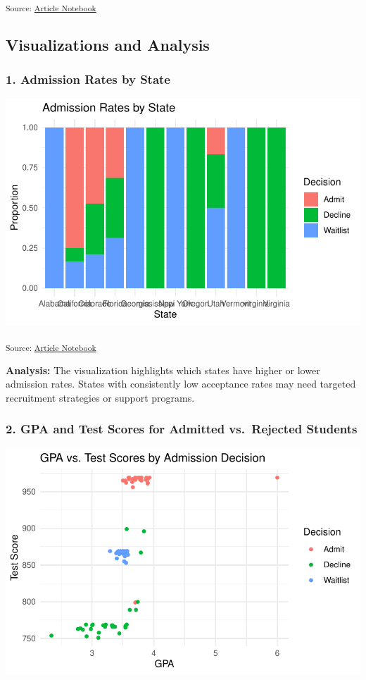 \documentclass[
  letterpaper,
  DIV=11,
  numbers=noendperiod]{scrartcl}
\begin{document}
\textsubscript{Source:
\href{https://verkyyi.github.io/5900-hw1/index.qmd.html}{Article
Notebook}}

\subsection{Visualizations and
Analysis}\label{visualizations-and-analysis}

\subsubsection{1. Admission Rates by
State}\label{admission-rates-by-state}

\includegraphics{index_files/figure-pdf/admission-rates-by-state-1.pdf}

\textsubscript{Source:
\href{https://verkyyi.github.io/5900-hw1/index.qmd.html}{Article
Notebook}}

\textbf{Analysis:} The visualization highlights which states have higher
or lower admission rates. States with consistently low acceptance rates
may need targeted recruitment strategies or support programs.

\subsubsection{2. GPA and Test Scores for Admitted vs.~Rejected
Students}\label{gpa-and-test-scores-for-admitted-vs.-rejected-students}

\includegraphics{index_files/figure-pdf/gpa-testscore-distribution-1.pdf}
\end{document}
